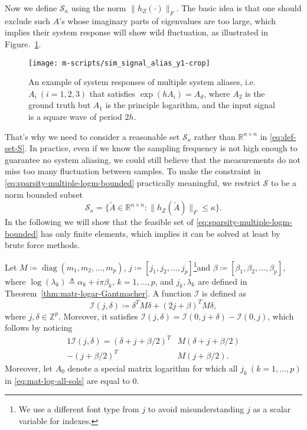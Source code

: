 \documentclass[letterpaper,10pt,journal,final]{IEEEtran}
\theoremstyle{definition}
\theoremstyle{remark}
\newcommand{\diag}{\operatorname{diag}}
\begin{document}
Now we define $\mathscr{S}_\kappa$ using the norm $\|h_Z(\cdot)\|_F$. The basic idea
is that one should exclude such $A$'s whose imaginary parts of eigenvalues are too
large, which implies their system response will show wild fluctuation, as illustrated
in Figure.~\ref{fig:responses-system-aliases}.
\begin{figure}[htb]   \centering
  \texttt{[image: m-scripts/sim\_signal\_alias\_y1-crop]}
  \caption{An example of system responses of multiple system aliases, i.e.
    $A_i\: (i \!=\!  1, 2, 3)$ that satisfies $\exp(hA_i) = A_d$, where $A_2$ is the
    ground truth but $A_1$ is the principle logarithm, and the input signal is a square
    wave of period $2h$.}
  \label{fig:responses-system-aliases}
\end{figure}
That's why we need to consider a reasonable set $\mathscr{S}_\kappa$ rather than
$\mathbb{R}^{n \times n}$ in \eqref{eq:def-set-S}.  In practice, even if we know
the sampling frequency is not high enough to guarantee no system aliasing, we
could still believe that the measurements do not miss too many fluctuation
between samples.  To make the constraint in
\eqref{eq:sparsity-multiple-logm-bounded} practically meaningful, we restrict
$\mathscr{S}$ to be a norm bounded subset
\begin{equation}
  \label{eq:norm-bounded-S}
  \mathscr{S}_\kappa = \big\{ \tilde{A} \in \mathbb{R}^{n \times n}: \|h_Z(\tilde{A})\|_F \leq \kappa \big\}.
\end{equation}
In the following we will show that the feasible set of
\eqref{eq:sparsity-multiple-logm-bounded} has only finite elements, which
implies it can be solved at least by brute force methods.

Let $M \coloneqq \diag(m_1, m_2, \dots, m_p)$, $\textit{j} \coloneqq [j_1, j_2,
\dots, j_p]$\footnote{We use a different font type from $j$ to avoid misunderstanding
$\textit{j}$ as a scalar variable for indexes.}and $\beta \coloneqq [\beta_1, \beta_2, \dots, \beta_p]$, where   $\log(\lambda_k) \triangleq \alpha_k + i\pi \beta_k$, $k = 1,\dots,p$, and $j_k, \lambda_k$ are defined in Theorem~\ref{thm:matr-logar-Gantmacher}. A function $\mathscr{I}$ is defined as
\begin{equation}
  \mathscr{I}(\textit{j}, \delta) \coloneqq \delta^T M \delta + (2\textit{j} + \beta)^T M \delta,
  \label{eq:func-def-dist-Fro-Aij}
\end{equation}
where $\textit{j}, \delta \in \mathbb{Z}^{p}$. Moreover, it satisfies
$\mathscr{I}(\textit{j}, \delta) = \mathscr{I}(0, \textit{j}+\delta) - \mathscr{I}(0, \textit{j})$, which follows by noticing
\begin{alignat}{1}
  \mathscr{I}(\textit{j}, \delta) = \left(\delta + \textit{j} + {\beta}/{2}\right)^T & M \left(\delta + \textit{j} + {\beta}/{2}\right) \nonumber\\
                       - \left(\textit{j} + {\beta}/{2}\right)^T & M \left(\textit{j} + {\beta}/{2}\right).
                       \label{eq:func-def-dist-Fro-Aij-compl-square-form}
\end{alignat}
Moreover, let $A_0$ denote a special matrix logarithm for which all $j_k\ (k = 1,\dots,p)$ in \eqref{eq:mat-log-all-sols} are equal to $0$.
\end{document}
